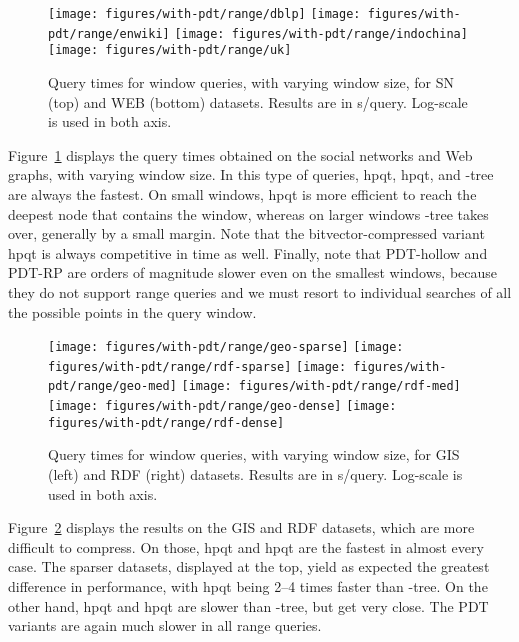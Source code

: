 \documentclass{elsarticle}
\newcommand{\kt}{-tree\xspace}
\newcommand{\ktdac}{-tree\xspace}
\newcommand{\hpqt}{\textsf{hpqt}\xspace}
\newcommand{\hpqtp}{\textsf{hpqt}\xspace}
\newcommand{\hpqtR}{\textsf{hpqt}\xspace}
\newcommand{\hpqtpdac}{\textsf{hpqt}\xspace}
\newcommand{\hpqtRdac}{\textsf{hpqt}\xspace}
\newcommand{\pdt}{PDT\xspace}
\newcommand{\pdth}{PDT-hollow\xspace}
\newcommand{\pdtrp}{PDT-RP\xspace}
\begin{document}
\begin{figure}[t]
 \centering
     \texttt{[image: figures/with-pdt/range/dblp]}
    \texttt{[image: figures/with-pdt/range/enwiki]}
    \texttt{[image: figures/with-pdt/range/indochina]}
    \texttt{[image: figures/with-pdt/range/uk]}
    \caption{Query times for window queries, with varying window size, for SN (top) and WEB (bottom) datasets. Results are in s/query. Log-scale is used in both axis.}
  \label{fig:rangeSW}
\end{figure}

Figure~\ref{fig:rangeSW} displays the query times obtained on the social networks and Web graphs, with varying window size. In this type of queries, \hpqtp, \hpqtpdac, and \ktdac are always the fastest. On small windows, \hpqt is more efficient to reach the deepest node that contains the window, whereas on larger windows \ktdac takes over, generally by a small margin. Note that the bitvector-compressed variant \hpqtRdac is always competitive in time as well. Finally, note that \pdth and \pdtrp are orders of magnitude slower even on the smallest windows, because they do not support range queries and we must resort to individual searches of all the possible points in the query window. 



\begin{figure}[t!]
 \centering
    \texttt{[image: figures/with-pdt/range/geo-sparse]}
    \texttt{[image: figures/with-pdt/range/rdf-sparse]}
    \texttt{[image: figures/with-pdt/range/geo-med]}
    \texttt{[image: figures/with-pdt/range/rdf-med]}
    \texttt{[image: figures/with-pdt/range/geo-dense]}
    \texttt{[image: figures/with-pdt/range/rdf-dense]}
  \caption{Query times for window queries, with varying window size, for GIS (left) and RDF (right) datasets. Results are in s/query. Log-scale is used in both axis.}
  \label{fig:rangeGR}
\end{figure}

Figure~\ref{fig:rangeGR} displays the results on the GIS and RDF datasets, which are more difficult to compress. On those, \hpqtp and \hpqtpdac are the fastest in almost every case. The sparser datasets, displayed at the top, yield as expected the greatest difference in performance, with \hpqtp being 2--4 times faster than \ktdac. On the other hand, \hpqtR and \hpqtRdac are slower than \kt, but get very close. The \pdt variants are again much slower in all range queries.
\end{document}
